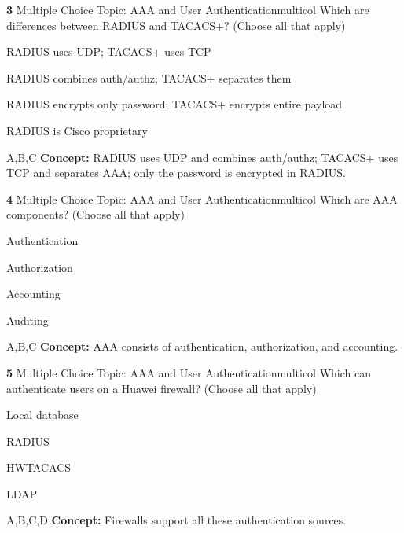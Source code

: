 \documentclass[10pt,a4paper]{article}
\begin{document}
\begin{qcard}{\color{white}\textbf{3} \hfill \small Multiple Choice \textbar{} Topic: AAA and User Authentication}{multicol}
Which are differences between RADIUS and TACACS+? (Choose all that apply)

\begin{qoptions}
\item RADIUS uses UDP; TACACS+ uses TCP
\item RADIUS combines auth/authz; TACACS+ separates them
\item RADIUS encrypts only password; TACACS+ encrypts entire payload
\item RADIUS is Cisco proprietary
\end{qoptions}
\begin{explainbox}{A,B,C}
\textbf{Concept:} RADIUS uses UDP and combines auth/authz; TACACS+ uses TCP and separates AAA; only the password is encrypted in RADIUS.
\end{explainbox}
\end{qcard}

\begin{qcard}{\color{white}\textbf{4} \hfill \small Multiple Choice \textbar{} Topic: AAA and User Authentication}{multicol}
Which are AAA components? (Choose all that apply)

\begin{qoptions}
\item Authentication
\item Authorization
\item Accounting
\item Auditing
\end{qoptions}
\begin{explainbox}{A,B,C}
\textbf{Concept:} AAA consists of authentication, authorization, and accounting.
\end{explainbox}
\end{qcard}

\begin{qcard}{\color{white}\textbf{5} \hfill \small Multiple Choice \textbar{} Topic: AAA and User Authentication}{multicol}
Which can authenticate users on a Huawei firewall? (Choose all that apply)

\begin{qoptions}
\item Local database
\item RADIUS
\item HWTACACS
\item LDAP
\end{qoptions}
\begin{explainbox}{A,B,C,D}
\textbf{Concept:} Firewalls support all these authentication sources.
\end{explainbox}
\end{qcard}
\end{document}
